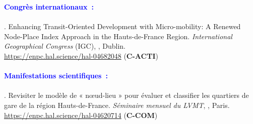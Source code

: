 \begin{refsegment}
     \newpage
     
    \begin{tcolorbox}[colback=white!5!white,
                      colframe=blue!75!blue,
                      title=Valorisation scientifique
                      \\
                      Chapitre~6]
\Large{\textcolor{blue}{\textbf{Congrès internationaux~:}}}
    \\\\
\small{\textcolor{blue}{\textcite{moinse_enhancing_2024}}. Enhancing Transit-Oriented Development with Micro-mobility: A Renewed Node-Place Index Approach in the Hauts-de-France Region. \textsl{International Geographical Congress} (IGC), \textsl{}, Dublin.
\\
\footnotesize{\url{https://enpc.hal.science/hal-04682048}} (\textbf{C-ACTI})}
    \\\\
\Large{\textcolor{blue}{\textbf{Manifestations scientifiques~:}}}
    \\\\
\small{\textcolor{blue}{\textcite{moinse_revisiter_2024}}. Revisiter le modèle de « nœud-lieu » pour évaluer et classifier les quartiers de gare de la région Hauts-de-France. \textit{Séminaire mensuel du LVMT}, , Paris.
\\
\footnotesize{\url{https://enpc.hal.science/hal-04620714}} (\textbf{C-COM})}
    \end{tcolorbox}

    \newpage
    \begingroup
    \renewcommand{\bibfont}{\scriptsize}
\printbibliography[segment=\therefsegment, heading=subbibintoc, title={Sous-bibliographie du chapitre~6}, label=chap6:bibliographie]
    \endgroup
    \end{refsegment}
